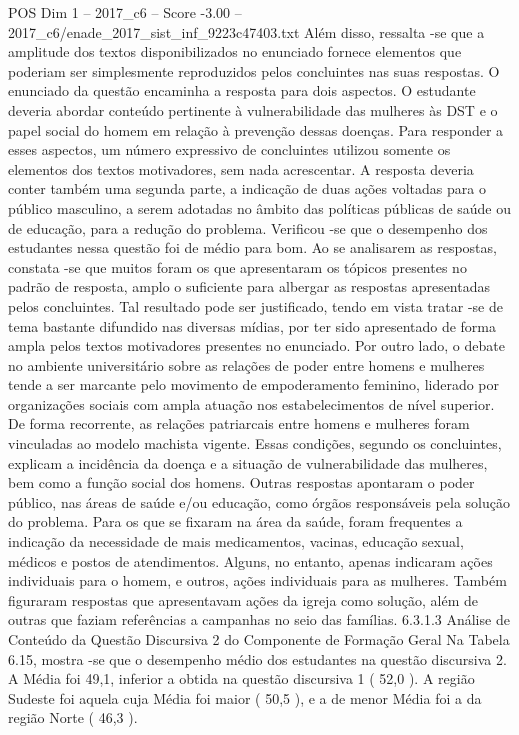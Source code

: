 \begin{textsample}{POS Dim 1 – 2017\_c6 – Score -3.00 – 2017\_c6/enade\_2017\_sist\_inf\_9223c47403.txt}
Além disso, ressalta -se que a amplitude dos textos disponibilizados no enunciado fornece elementos que poderiam ser simplesmente reproduzidos pelos concluintes nas suas respostas.
O enunciado da questão encaminha a resposta para dois aspectos.
O estudante deveria abordar conteúdo pertinente à vulnerabilidade das mulheres às DST e o papel social do homem em relação à prevenção dessas doenças.
Para responder a esses aspectos, um número expressivo de concluintes utilizou somente os elementos dos textos motivadores, sem nada acrescentar.
A resposta deveria conter também uma segunda parte, a indicação de duas ações voltadas para o público masculino, a serem adotadas no âmbito das políticas públicas de saúde ou de educação, para a redução do problema.
Verificou -se que o desempenho dos estudantes nessa questão foi de médio para bom.
Ao se analisarem as respostas, constata -se que muitos foram os que apresentaram os tópicos presentes no padrão de resposta, amplo o suficiente para albergar as respostas apresentadas pelos concluintes.
Tal resultado pode ser justificado, tendo em vista tratar -se de tema bastante difundido nas diversas mídias, por ter sido apresentado de forma ampla pelos textos motivadores presentes no enunciado.
Por outro lado, o debate no ambiente universitário sobre as relações de poder entre homens e mulheres tende a ser marcante pelo movimento de empoderamento feminino, liderado por organizações sociais com ampla atuação nos estabelecimentos de nível superior.
De forma recorrente, as relações patriarcais entre homens e mulheres foram vinculadas ao modelo machista vigente.
Essas condições, segundo os concluintes, explicam a incidência da doença e a situação de vulnerabilidade das mulheres, bem como a função social dos homens.
Outras respostas apontaram o poder público, nas áreas de saúde e/ou educação, como órgãos responsáveis pela solução do problema.
Para os que se fixaram na área da saúde, foram frequentes a indicação da necessidade de mais medicamentos, vacinas, educação sexual, médicos e postos de atendimentos.
Alguns, no entanto, apenas indicaram ações individuais para o homem, e outros, ações individuais para as mulheres.
Também figuraram respostas que apresentavam ações da igreja como solução, além de outras que faziam referências a campanhas no seio das famílias. 6.3.1.3 Análise de Conteúdo da Questão Discursiva 2 do Componente de Formação Geral Na Tabela 6.15, mostra -se que o desempenho médio dos estudantes na questão discursiva 2.
A Média foi 49,1, inferior a obtida na questão discursiva 1 ( 52,0 ).
A região Sudeste foi aquela cuja Média foi maior ( 50,5 ), e a de menor Média foi a da região Norte ( 46,3 ).

\end{textsample}
